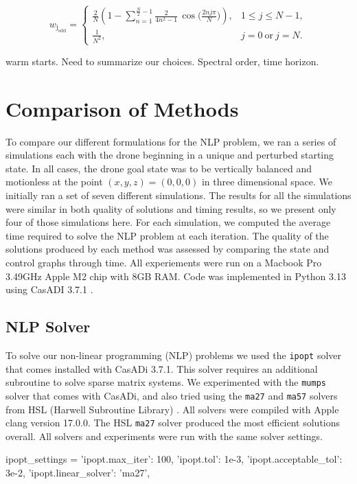 \documentclass[]{article}
\begin{document}
	\[
        w_{\mathrm{j_{odd}}} =
        \begin{cases}
        \displaystyle
        \frac{2}{N}\!\left(
        1 - \sum_{n=1}^{\frac{N}{2}-1} \frac{2}{4n^{2}-1}\,
        \cos\!\Big(\tfrac{2 n j \pi}{N}\Big)
        \right), & 1 \le j \le N-1, \\[2ex]
        \displaystyle \frac{1}{N^{2}}, & j=0\ \text{or}\ j=N.
        \end{cases}
        \]

warm starts.
Need to summarize our choices.  Spectral order, time horizon.

\section*{Comparison of Methods}

To compare our different formulations for the NLP problem, we ran a series of simulations each with the drone beginning in a unique and perturbed starting state. In all cases, the drone goal state was to be vertically balanced and motionless at the point $(x,y,z) = (0, 0, 0)$ in three dimensional space. We initially ran a set of seven different simulations. The results for all the simulations were similar in both quality of solutions and timing results, so we present only four of those simulations here.  For each simulation, we computed the average time required to solve the NLP problem at each iteration. The quality of the solutions produced by each method was assessed by comparing the state and control graphs through time. All experiements were run on a Macbook Pro  3.49GHz Apple M2 chip with 8GB RAM. Code was implemented in Python 3.13 using CasADI 3.7.1 \citep{Andersson2018}. 
	
	\subsection*{NLP Solver}
	To solve our non-linear programming (NLP) problems we used the \texttt{ipopt} solver \citep{ipopt} that comes installed with CasADi 3.7.1.  This solver requires an additional subroutine to  solve sparse matrix systems. We experimented with the \texttt{mumps}  solver that comes with CasADi, and also tried using the  \texttt{ma27} and  \texttt{ma57} solvers  from HSL (Harwell Subroutine Library) \citep{hsl}. All solvers were compiled with Apple clang version 17.0.0. The HSL \texttt{ma27} solver produced the most efficient solutions overall. All solvers and experiments were run with the same solver settings.
	\vspace{\baselineskip}
	\begin{python}
        ipopt_settings = {
			'ipopt.max_iter': 100,                  
			'ipopt.tol': 1e-3,                      	
			'ipopt.acceptable_tol': 3e-2,
			'ipopt.linear_solver': 'ma27',
		}
	\end{python}
\end{document}
